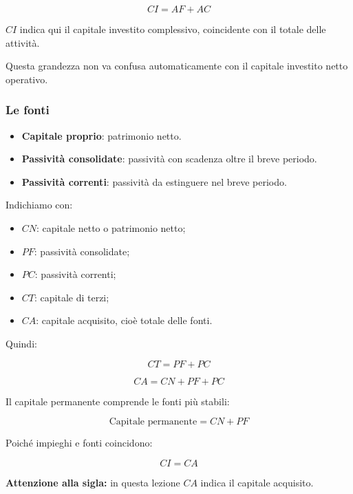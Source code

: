 \[
\boxed{
CI=AF+AC
}
\]

\noindent $CI$ indica qui
il capitale investito complessivo,
coincidente con il totale delle attività.

\noindent Questa grandezza
non va confusa automaticamente
con il capitale investito netto operativo.


\subsubsection*{Le fonti}

\begin{itemize}
    \item \textbf{Capitale proprio}:
    patrimonio netto.

    \item \textbf{Passività consolidate}:
    passività con scadenza
    oltre il breve periodo.

    \item \textbf{Passività correnti}:
    passività da estinguere
    nel breve periodo.
\end{itemize}

\noindent Indichiamo con:

\begin{itemize}
    \item $CN$: capitale netto
    o patrimonio netto;

    \item $PF$: passività consolidate;

    \item $PC$: passività correnti;

    \item $CT$: capitale di terzi;

    \item $CA$: capitale acquisito,
    cioè totale delle fonti.
\end{itemize}

\noindent Quindi:

\[
\boxed{
CT=PF+PC
}
\]

\[
\boxed{
CA=CN+PF+PC
}
\]

\noindent Il capitale permanente
comprende le fonti più stabili:

\[
\boxed{
\text{Capitale permanente}=CN+PF
}
\]

\noindent Poiché impieghi e fonti coincidono:

\[
\boxed{
CI=CA
}
\]

\noindent \textbf{Attenzione alla sigla:}
in questa lezione $CA$
indica il capitale acquisito.

